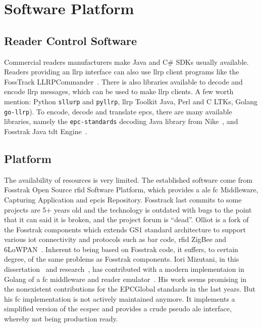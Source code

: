 \section{Software Platform}

\subsection{Reader Control Software}

Commercial readers manufacturers make Java and C\# SDKs usually available. Readers providing an \ac{llrp} interface can also use \ac{llrp} client programs like the FossTrack LLRPCommander~\cite{FosstrakLLRPCommander}. There is also libraries available to decode and encode \ac{llrp} messages, which can be used to make \ac{llrp} clients. A few worth mention: Python \texttt{sllurp} and \texttt{pyllrp}, \ac{llrp} Toolkit Java, Perl and C\+\+ LTKs\cite{LlrpOrga}, Golang \texttt{go-llrp}).
To encode, decode and translate \acp{epc}, there are many available libraries, namely the \texttt{epc-standards} decoding Java library from Nike~\cite{NikeIncEpcstandards2019}, and Fosstrak Java \ac{tdt} Engine~\cite{FosstrakTagData}.

\subsection{Platform}

The availability of resources is very limited.
The established software come from Fosstrak Open Source \ac{rfid} Software Platform, which provides a \ac{ale} \ac{fc} Middleware, Capturing Application and \ac{epcis} Repository. Fosstrack last commits to some projects are 5+ years old and the technology is outdated with bugs to the point that it can said it is broken, and the project forum is ``dead''.
Olliot is a fork of the Fosstrak components which extends GS1 standard architecture to support various \ac{iot} connectivity and protocols such as bar code, \ac{rfid} ZigBee and 6LoWPAN~\cite{OpenLanguageInternet}. Inherent to being based on Fosstrak code, it suffers, to certain degree, of the same problems as Fosstrak components.
Iori Mizutani, in this dissertation~\cite{mizutaniRobustHighPerformance} and research~\cite{mizutaniMulticodePortableRFID2016b}, has contributed with a modern implementaion in Golang of a \ac{fc} middleware and reader emulator~\cite{mizutaniIomzGolemu2020, mizutaniIomzGosstrak2020}. His work seems promising in the nonexistent contributions for the EPCGlobal standards in the last years. But his \ac{fc} implementation is not actively maintained anymore. It implements a simplified version of the \ac{ecspec} and provides a crude pseudo \ac{ale} interface, whereby not being production ready.


